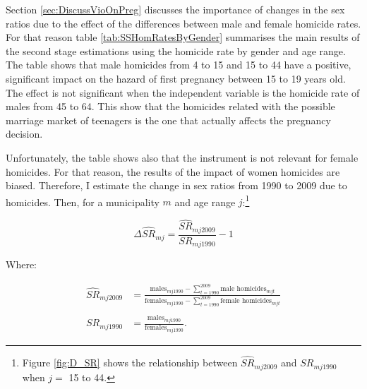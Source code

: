 \documentclass[a4paper,10pt,twocolumn,preprint,3p,authoryear]{elsarticle}
\begin{document}
Section \ref{sec:DiscussVioOnPreg} discusses the importance of changes in the sex ratios due to the effect of the differences between male and female homicide rates. For that reason table \ref{tab:SSHomRatesByGender} summarises the main results of the second stage estimations using the homicide rate by gender and age range. The table shows that male homicides from 4 to 15 and 15 to 44 have a positive, significant impact on the hazard of first pregnancy between 15 to 19 years old. The effect is not significant when the independent variable is the homicide rate of males from 45 to 64. This show that the homicides related with the possible marriage market of teenagers is the one that actually affects the pregnancy decision. 

Unfortunately, the table shows also that the instrument is not relevant for female homicides. For that reason, the results of the impact of women homicides are biased. Therefore, I estimate the change in sex ratios from 1990 to 2009 due to homicides. Then, for a municipality $m$ and age range $j$:\footnote{Figure \ref{fig:D_SR} shows the relationship between $\hat{SR}_{mj2009}$ and $SR_{mj1990}$ when $j=$ 15 to 44.}

\begin{equation*}
	\Delta \hat{SR}_{mj} = \frac{\hat{SR}_{mj2009}}{SR_{mj1990}} -1
\end{equation*}

Where: 

\begin{align*}
	\hat{SR}_{mj2009} &= \frac{\textrm{males}_{mj1990} - \sum_{t=1990}^{2009}\textrm{male homicides}_{mjt}}{\textrm{females}_{mj1990} - \sum_{t=1990}^{2009}\textrm{female homicides}_{mjt}} \\ \\
	SR_{mj1990} &= \frac{\textrm{males}_{mj1990}}{\textrm{females}_{mj1990}}.
\end{align*}
\end{document}

